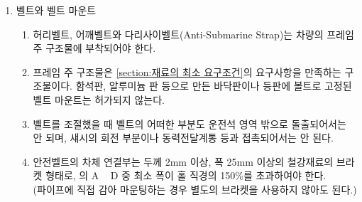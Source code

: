 \documentclass[final,a4paper,10pt]{report}
\begin{document}
\begin{enumerate}
\begin{enumerate}
        \item\label{rule:formula-technical.safety-belt.harness.accepted-certification-standards} 인증 규격은 하기의 규격 혹은 그 이후의 인증 규격을 인정한다.
          \begin{itemize}
            \item SFI Specification 16.1
            \item SFI Specification 16.5
            \item FIA specification 8853/98
            \item FIA specification 8853/2016
          \end{itemize}
      \end{enumerate}
    \item\label{rule:formula-technical.safety-belt.belt-mounting} 벨트와 벨트 마운트
      \begin{enumerate}
        \item\label{rule:formula-technical.safety-belt.belt-mounting.attached-to-primary-structure} 허리벨트, 어깨벨트와 다리사이벨트(Anti-Submarine Strap)는 차량의 프레임 주 구조물에 부착되어야 한다.
        \item\label{rule:formula-technical.safety-belt.belt-mounting.no-sheet-panel-mounts} 프레임 주 구조물은 \ref{section:재료의 최소 요구조건}의 요구사항을 만족하는 구조물이다. 함석판, 알루미늄 판 등으로 만든 바닥판이나 등판에 볼트로 고정된 벨트 마운트는 허가되지 않는다.
        \item\label{rule:formula-technical.safety-belt.belt-mounting.clear-of-cockpit-drivetrain} 벨트를 조절했을 때 벨트의 어떠한 부분도 운전석 영역 밖으로 돌출되어서는 안 되며, 섀시의 회전 부분이나 동력전달계통 등과 접촉되어서는 안 된다.
        \item\label{rule:formula-technical.safety-belt.belt-mounting.bracket-thickness-and-width} 안전벨트의 차체 연결부는 두께 2mm 이상, 폭 25mm 이상의 철강재료의 브라켓 형태로, 의 A \string~ D 중 최소 폭이 홀 직경의 150\%를 초과하여야 한다.\\
        (파이프에 직접 감아 마운팅하는 경우 별도의 브라켓을 사용하지 않아도 된다.)



\end{enumerate}
\end{enumerate}
\end{document}
